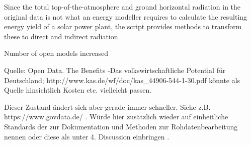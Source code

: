 
Since the total top-of-the-atmosphere and ground horizontal radiation in the original data is not what an energy modeller requires to calculate the resulting energy yield of a solar power plant, the script provides methods to transform these to direct and indirect radiation.

Number of open models increased \cite{openmod2018}


 Quelle: Open Data. The Benefits -Das volkswirtschaftliche Potential für Deutschland; http://www.kas.de/wf/doc/kas_44906-544-1-30.pdf könnte als Quelle hinsichtlich Kosten etc. vielleicht passen.
 
 Dieser Zustand ändert sich aber gerade immer schneller. Siehe z.B. https://www.govdata.de/ . Würde hier zusätzlich wieder auf einheitliche Standards der zur Dokumentation und Methoden zur Rohdatenbearbeitung nennen oder diese als unter 4. Discussion einbringen .
 
